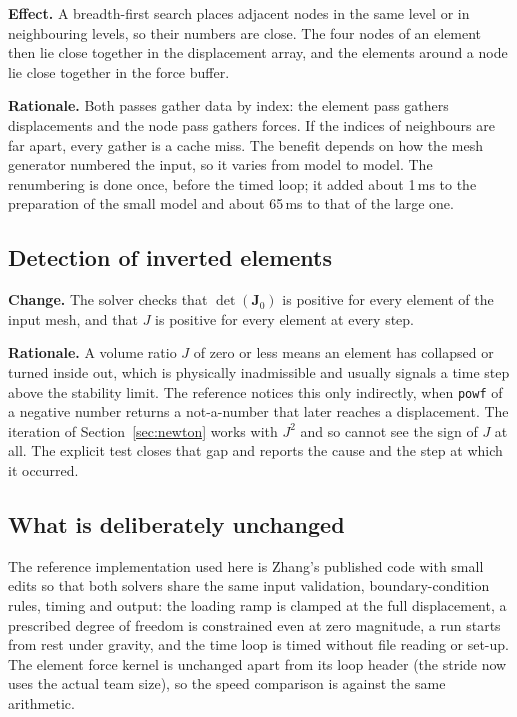\documentclass[11pt,a4paper]{article}
\newcommand{\code}[1]{\texttt{#1}}
\newcommand{\mat}[1]{\mathbf{#1}}
\begin{document}
\textbf{Effect.} A breadth-first search places adjacent nodes in the same level or in neighbouring levels, so their numbers are close. The four nodes of an element then lie close together in the displacement array, and the elements around a node lie close together in the force buffer.

\textbf{Rationale.} Both passes gather data by index: the element pass gathers displacements and the node pass gathers forces. If the indices of neighbours are far apart, every gather is a cache miss. The benefit depends on how the mesh generator numbered the input, so it varies from model to model. The renumbering is done once, before the timed loop; it added about 1\,ms to the preparation of the small model and about 65\,ms to that of the large one.

\subsection{Detection of inverted elements}
\label{sec:inverted}

\textbf{Change.} The solver checks that $\det(\mat{J}_0)$ is positive for every element of the input mesh, and that $J$ is positive for every element at every step.

\textbf{Rationale.} A volume ratio $J$ of zero or less means an element has collapsed or turned inside out, which is physically inadmissible and usually signals a time step above the stability limit. The reference notices this only indirectly, when \code{powf} of a negative number returns a not-a-number that later reaches a displacement. The iteration of Section~\ref{sec:newton} works with $J^2$ and so cannot see the sign of $J$ at all. The explicit test closes that gap and reports the cause and the step at which it occurred.

\subsection{What is deliberately unchanged}
\label{sec:unchanged}

The reference implementation used here is Zhang's published code with small edits so that both solvers share the same
input validation, boundary-condition rules, timing and output: the loading ramp is clamped at the full displacement, a
prescribed degree of freedom is constrained even at zero magnitude, a run starts from rest under gravity, and the time
loop is timed without file reading or set-up. The element force kernel is unchanged apart from its loop header (the
stride now uses the actual team size), so the speed comparison is against the same arithmetic.
\end{document}
